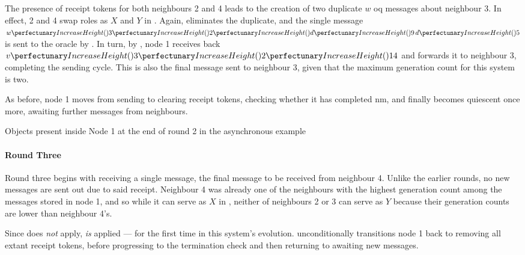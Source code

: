 The presence of receipt tokens for both neighbours 2 and 4 leads to the creation of two duplicate \(w\) \gls{oq} messages about neighbour 3.  In effect, 2 and 4 swap roles as \(X\) and \(Y\) in .  Again,  eliminates the duplicate, and the single message \(\cpvw{3}{2}{\cpfunc{d}{9} \, \cpfunc{d}{5}}\) is sent to the oracle by .  In turn, by , node 1 receives back \(\cpvv{3}{2}{14}\) and forwards it to neighbour 3, completing the sending cycle.  This is also the final message sent to neighbour 3, given that the maximum generation count for this system is two.

As before, node 1 moves from sending to clearing receipt tokens, checking whether it has completed \gls{nm}, and finally becomes quiescent once more, awaiting further messages from neighbours.

\begin{cpobjectsfloat}
\begin{cpobjects}
\end{cpobjects}
\caption{\label{objs:nmp:ex2}Objects present inside Node 1 at the end of round 2 in the asynchronous  example}
\end{cpobjectsfloat}

\paragraph{Round Three}
Round three begins with receiving a single message, the final message to be received from neighbour 4.  Unlike the earlier rounds, no new messages are sent out due to said receipt.  Neighbour 4 was already one of the neighbours with the highest generation count among the messages stored in node 1, and so while it can serve as \(X\) in , neither of neighbours 2 or 3 can serve as \(Y\) because their generation counts are lower than neighbour 4's.

Since  does \emph{not} apply,  \emph{is} applied --- for the first time in this system's evolution.   unconditionally transitions node 1 back to removing all extant receipt tokens, before progressing to the termination check and then returning to awaiting new messages.

